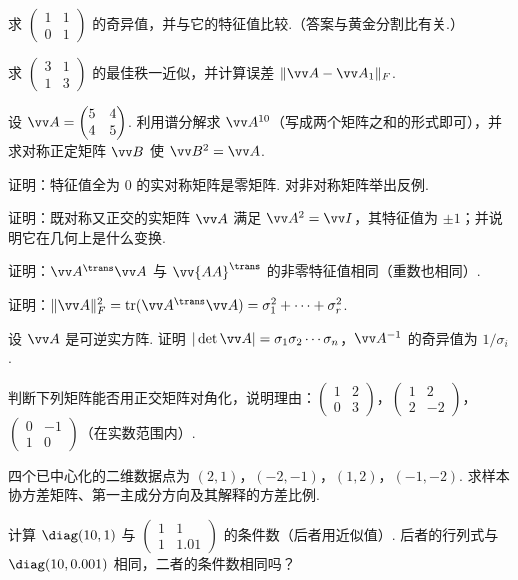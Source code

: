{\begin{exA}
			\item\label{ex:dec:A8} 求 $\begin{pmatrix}1&1\\0&1\end{pmatrix}$ 的奇异值，并与它的特征值比较.（答案与黄金分割比有关.）
			\item\label{ex:dec:A9} 求 $\begin{pmatrix}3&1\\1&3\end{pmatrix}$ 的最佳秩一近似，并计算误差 $\|\vv A-\vv A_1\|_F$.
			\item\label{ex:dec:A10} 设 $\vv A=\begin{pmatrix}5&4\\4&5\end{pmatrix}$. 利用谱分解求 $\vv A^{10}$（写成两个矩阵之和的形式即可），并求对称正定矩阵 $\vv B$ 使 $\vv B^2=\vv A$.
			\item\label{ex:dec:A11} 证明：特征值全为 $0$ 的实对称矩阵是零矩阵. 对非对称矩阵举出反例.
			\item\label{ex:dec:A12} 证明：既对称又正交的实矩阵 $\vv A$ 满足 $\vv A^2=\vv I$，其特征值为 $\pm1$；并说明它在几何上是什么变换.
			\item\label{ex:dec:A13} 证明：$\vv A^\trans\vv A$ 与 $\vv{AA}^\trans$ 的非零特征值相同（重数也相同）.
			\item\label{ex:dec:A14} 证明：$\|\vv A\|_F^2=\tr(\vv A^\trans\vv A)=\sigma_1^2+\cdots+\sigma_r^2$.
			\item\label{ex:dec:A15} 设 $\vv A$ 是可逆实方阵. 证明 $|\det\vv A|=\sigma_1\sigma_2\cdots\sigma_n$，$\vv A^{-1}$ 的奇异值为 $1/\sigma_i$.
			\item\label{ex:dec:A16} 判断下列矩阵能否用正交矩阵对角化，说明理由：$\begin{pmatrix}1&2\\0&3\end{pmatrix}$，$\begin{pmatrix}1&2\\2&-2\end{pmatrix}$，$\begin{pmatrix}0&-1\\1&0\end{pmatrix}$（在实数范围内）.
			\item\label{ex:dec:A17} 四个已中心化的二维数据点为 $(2,1)$，$(-2,-1)$，$(1,2)$，$(-1,-2)$. 求样本协方差矩阵、第一主成分方向及其解释的方差比例.
			\item\label{ex:dec:A18} 计算 $\diag(10,1)$ 与 $\begin{pmatrix}1&1\\1&1.01\end{pmatrix}$ 的条件数（后者用近似值）. 后者的行列式与 $\diag(10,0.001)$ 相同，二者的条件数相同吗？

\end{exA}}
